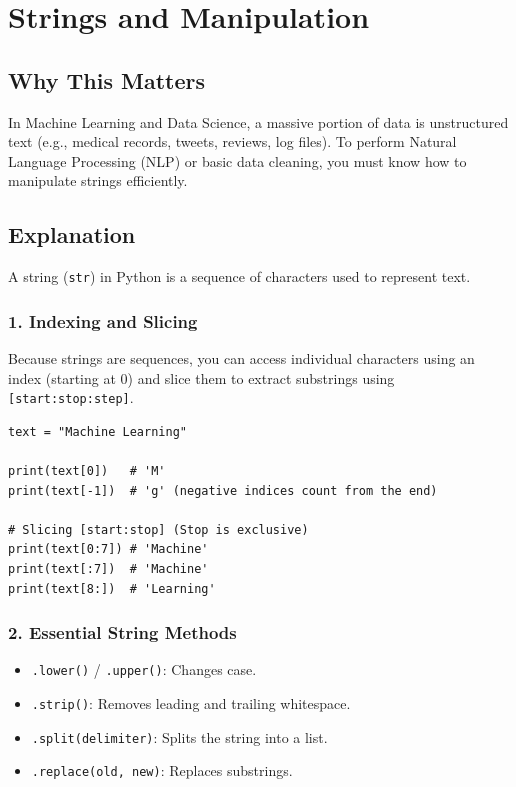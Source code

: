 \chapter{Strings and Manipulation}

\section{Why This Matters}
In Machine Learning and Data Science, a massive portion of data is unstructured text (e.g., medical records, tweets, reviews, log files). To perform Natural Language Processing (NLP) or basic data cleaning, you must know how to manipulate strings efficiently.

\section{Explanation}
A string (\texttt{str}) in Python is a sequence of characters used to represent text. 


\subsection{1. Indexing and Slicing}
Because strings are sequences, you can access individual characters using an index (starting at 0) and slice them to extract substrings using \texttt{[start:stop:step]}.

\begin{lstlisting}
text = "Machine Learning"

print(text[0])   # 'M'
print(text[-1])  # 'g' (negative indices count from the end)

# Slicing [start:stop] (Stop is exclusive)
print(text[0:7]) # 'Machine'
print(text[:7])  # 'Machine'
print(text[8:])  # 'Learning'
\end{lstlisting}

\subsection{2. Essential String Methods}
\begin{itemize}
    \item \texttt{.lower()} / \texttt{.upper()}: Changes case.
    \item \texttt{.strip()}: Removes leading and trailing whitespace.
    \item \texttt{.split(delimiter)}: Splits the string into a list.
    \item \texttt{.replace(old, new)}: Replaces substrings.
\end{itemize}

